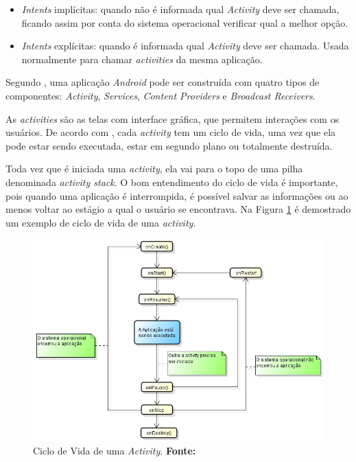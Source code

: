 	\begin{itemize}
	  
	  \item \textit{Intents} implícitas: quando não é informada qual
	  \textit{Activity} deve ser chamada, ficando assim por conta do sistema
	  operacional verificar qual a melhor opção.
	  
	  \item \textit{Intents} explícitas: quando é informada qual
	  \textit{Activity} deve ser chamada. Usada normalmente para chamar
	  \textit{activities} da mesma aplicação.
	  
	\end{itemize}
	
	\par Segundo , uma aplicação \textit{Android} pode ser
construída com quatro tipos de componentes: \textit{Activity},
\textit{Services}, \textit{Content Providers} e \textit{Broadcast Receivers}.

	\par As \textit{activities} são as telas com interface gráfica, que permitem
interações com os usuários. De acordo com , cada
\textit{activity} tem um ciclo de vida, uma vez que ela pode estar sendo
executada, estar em segundo plano ou totalmente destruída.

	\par Toda vez que é iniciada uma \textit{activity}, ela vai para o topo de uma
pilha denominada \textit{activity stack}. O bom entendimento do ciclo de vida é
importante, pois quando uma aplicação é interrompida, é possível salvar as
informações ou ao menos voltar ao estágio a qual o usuário se encontrava. Na
Figura \ref{fig:qt1} é demostrado um exemplo de ciclo de vida de uma
\textit{activity}.

\begin{figure}[h!]
	\centerline{\includegraphics[scale=0.5]{./imagens/1_q_teorico/qt1.png}}
	\caption[Ciclo de Vida de uma \textit{Activity} ]{Ciclo de Vida de uma
	\textit{Activity}.
	 \textbf{Fonte:}}
	\label{fig:qt1}
\end{figure}

